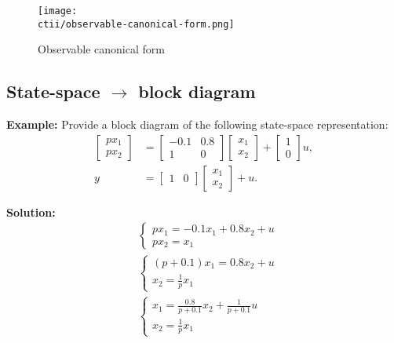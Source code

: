 \begin{multicols}{2}
\begin{figure}[H]
    \centering
    \texttt{[image: \\ctii/observable-canonical-form.png]}
    \caption{Observable canonical form}
\end{figure}


\subsection{State-space $\rightarrow$ block diagram}
\textbf{Example:}
Provide a block diagram of the following state-space representation:
\begin{align*}
    \begin{bmatrix} px_1 \\ px_2 \end{bmatrix} &= 
    \begin{bmatrix} -0.1 & 0.8 \\ 1 & 0 \end{bmatrix}
    \begin{bmatrix} x_1 \\ x_2 \end{bmatrix} 
    +\begin{bmatrix} 1 \\ 0 \end{bmatrix}u, \\
    y &= \begin{bmatrix} 1 & 0 \end{bmatrix}
    \begin{bmatrix} x_1 \\ x_2 \end{bmatrix} 
    +u.
\end{align*}

\textbf{Solution:}
\begin{align*}
    &\begin{cases}
        px_1 = -0.1x_1 + 0.8x_2 + u \\
        px_2 = x_1
    \end{cases} \\
    &\begin{cases}
        (p + 0.1)x_1 = 0.8x_2 + u \\
        x_2 = \frac{1}{p}x_1
    \end{cases} \\
    &\begin{cases}
        x_1 = \frac{0.8}{p + 0.1}x_2 + \frac{1}{p + 0.1}u \\
        x_2 = \frac{1}{p}x_1
    \end{cases}
\end{align*}


\end{multicols}
